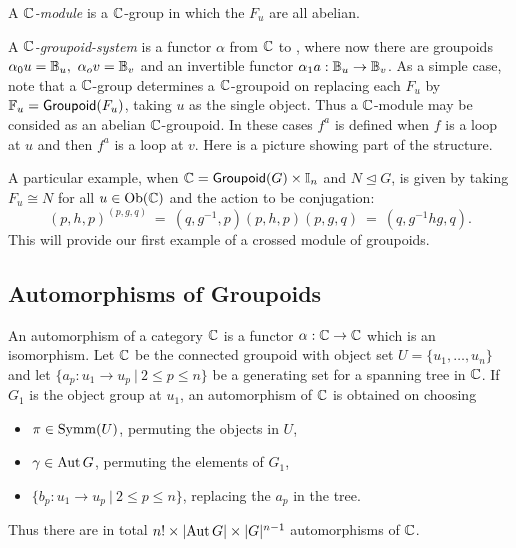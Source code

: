 A \emph{$\mathbb{C}$-module} is a $\mathbb{C}$-group in which the $F_u$ are all abelian. 

A \emph{$\mathbb{C}$-groupoid-system} is a functor 
$\alpha$ from $\mathbb{C}$ to \catGpd, 
where now there are groupoids $\alpha_0u = \mathbb{B}_u,~ \alpha_ov = \mathbb{B}_v$ 
and an invertible functor $\alpha_1a : \mathbb{B}_u \to \mathbb{B}_v$. 
As a simple case, note that a $\mathbb{C}$-group determines a $\mathbb{C}$-groupoid 
on replacing each $F_u$ by $\mathbb{F}_u = {\sf Groupoid}(F_u)$, 
taking $u$ as the single object. 
Thus a $\mathbb{C}$-module may be consided as an abelian $\mathbb{C}$-groupoid. 
In these cases $f^a$ is defined when $f$ is a loop at $u$ 
and then $f^a$ is a loop at $v$. 
Here is a picture showing part of the structure.

\begin{figure}[htbp]
\begin{center}

\label{figure:gpd-gps}
\end{center}
\end{figure}

A particular example, when $\mathbb{C}={\sf Groupoid}(G)\times\mathbb{I}_n$ and $N \unlhd G$, 
is given by taking $F_u \cong N$ for all $u \in \mathrm{Ob}(\mathbb{C})$ and the action 
to be conjugation:
\begin{equation} \label{eq:gpd-conj}
(p,h,p)^{(p,g,q)} ~=~ (q,g^{-1},p)(p,h,p)(p,g,q) ~=~ (q,g^{-1}hg,q). 
\end{equation}
This will provide our first example of a crossed module of groupoids. 



\newpage
\subsection{Automorphisms of Groupoids}

An automorphism of a category $\mathbb{C}$ is a functor $\alpha : \mathbb{C} \to \mathbb{C}$ 
which is an isomorphism. 
Let $\mathbb{C}$ be the connected groupoid with object set $U=\{u_1,\ldots,u_n\}$ 
and let $\{a_p : u_1 \to u_p ~|~ 2 \leqslant p \leqslant n\}$ 
be a generating set for a spanning tree in $\mathbb{C}$. 
If $G_1$ is the object group at $u_1$, 
an automorphism of $\mathbb{C}$ is obtained on choosing 
\begin{itemize}
\item
$\pi \in \mathrm{Symm}(U)$, permuting the objects in $U$, 
\item
$\gamma \in \mathrm{Aut}\,G$, permuting the elements of $G_1$, 
\item
$\{b_p : u_1 \to u_p ~|~ 2 \leqslant p \leqslant n\}$, 
replacing the $a_p$ in the tree. 
\end{itemize}
Thus there are in total $n! \times |\mathrm{Aut}\,G| \times |G|^{n-1}$ 
automorphisms of $\mathbb{C}$. 

